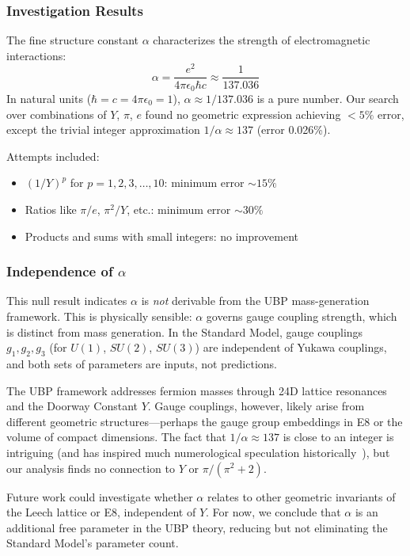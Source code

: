 \documentclass[11pt,a4paper]{article}
\begin{document}
\subsubsection{Investigation Results}

The fine structure constant $\alpha$ characterizes the strength of electromagnetic interactions:
\begin{equation}
\alpha = \frac{e^2}{4\pi \epsilon_0 \hbar c} \approx \frac{1}{137.036}
\end{equation}
In natural units ($\hbar = c = 4\pi\epsilon_0 = 1$), $\alpha \approx 1/137.036$ is a pure number. Our search over combinations of $Y$, $\pi$, $e$ found no geometric expression achieving $<5\%$ error, except the trivial integer approximation $1/\alpha \approx 137$ (error 0.026\%).

Attempts included:
\begin{itemize}
\item $(1/Y)^p$ for $p = 1, 2, 3, \ldots, 10$: minimum error $\sim 15\%$
\item Ratios like $\pi/e$, $\pi^2/Y$, etc.: minimum error $\sim 30\%$
\item Products and sums with small integers: no improvement
\end{itemize}

\subsubsection{Independence of $\alpha$}

This null result indicates $\alpha$ is \emph{not} derivable from the UBP mass-generation framework. This is physically sensible: $\alpha$ governs gauge coupling strength, which is distinct from mass generation. In the Standard Model, gauge couplings $g_1, g_2, g_3$ (for $U(1)$, $SU(2)$, $SU(3)$) are independent of Yukawa couplings, and both sets of parameters are inputs, not predictions.

The UBP framework addresses fermion masses through 24D lattice resonances and the Doorway Constant $Y$. Gauge couplings, however, likely arise from different geometric structures—perhaps the gauge group embeddings in E8 or the volume of compact dimensions. The fact that $1/\alpha \approx 137$ is close to an integer is intriguing (and has inspired much numerological speculation historically~\cite{ref003}), but our analysis finds no connection to $Y$ or $\pi/(\pi^2+2)$.

Future work could investigate whether $\alpha$ relates to other geometric invariants of the Leech lattice or E8, independent of $Y$. For now, we conclude that $\alpha$ is an additional free parameter in the UBP theory, reducing but not eliminating the Standard Model's parameter count.
\end{document}
